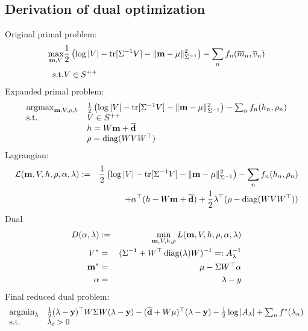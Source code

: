 \documentclass[10pt,english]{article}
\begin{document}
\subsection{Derivation of dual optimization}
Original primal problem:
\begin{eqnarray*}
\max_{\mathbf{m},V}	&	\frac{1}{2}\left(\log\vert V\vert-\operatorname{tr}[\Sigma^{-1}V]-\Vert\mathbf{m}-\mu\Vert^2_{\Sigma^{-1}}    \right)-\sum_{n} f_n(\overline m_n,\overline v_n)\\
\mbox{s.t.}	&	V\in S^{++}
\end{eqnarray*}
Expanded primal problem:
\begin{eqnarray*}
 \begin{array}{ll} 	\operatorname{argmax}_{\mathbf{m},V,\rho,h}	&	\frac{1}{2}\left(\log\vert V\vert-\operatorname{tr}[\Sigma^{-1}V]-\Vert\mathbf{m}-\mu\Vert^2_{\Sigma^{-1}}    \right)-\sum_{n} f_n(h_n,\rho_n)\\
			\mbox{s.t.}		&	V\in S^{++}\\
						&	h=W\mathbf{m}+\overline{\mathbf{d}}\\
						&	\rho=\operatorname{diag}(WVW^\top)
 \end{array}
\end{eqnarray*}
Lagrangian:
\begin{eqnarray*}
  \mathcal L(\mathbf{m},V,h,\rho,\alpha,\lambda)	&:=&	\frac{1}{2}\left(\log\vert V\vert-\operatorname{tr}[\Sigma^{-1}V]-\Vert\mathbf{m}-\mu\Vert^2_{\Sigma^{-1}}    \right)-\sum_{n} f_n(h_n,\rho_n)\\
						&&	+\alpha^\top(h-W\mathbf{m}+\overline{\mathbf{d}})+\frac{1}{2}\lambda^\top(\rho-\operatorname{diag}(WVW^\top))
\end{eqnarray*}
Dual
\begin{eqnarray*}
 D(\alpha,\lambda)				&:=&	\min_{\mathbf{m},V,h,\rho}L(\mathbf{m},V,h,\rho,\alpha,\lambda)\\
 V^\ast						&=&	(\Sigma^{-1}+W^\top \operatorname{diag}(\lambda)W)^{-1}=:A_\lambda^{-1}\\
\mathbf{m}^\ast					&=&	\mu-\Sigma W^\top\alpha\\
\alpha						&=&	\lambda-y
\end{eqnarray*}
Final reduced dual problem:
\begin{eqnarray*}
 \begin{array}{ll} 	\operatorname{argmin}_{\lambda}	&	\frac{1}{2} (\lambda-\mathbf{y})^\top W\Sigma W(\lambda-\mathbf{y})-(\overline{\mathbf{d}}+W\mu)^\top(\lambda-\mathbf{y})-\frac{1}{2}\log\vert A_\lambda\vert+\sum_nf^\ast(\lambda_n)\\
			\mbox{s.t.}		&	\lambda_i>0
 \end{array}
\end{eqnarray*}
\end{document}
